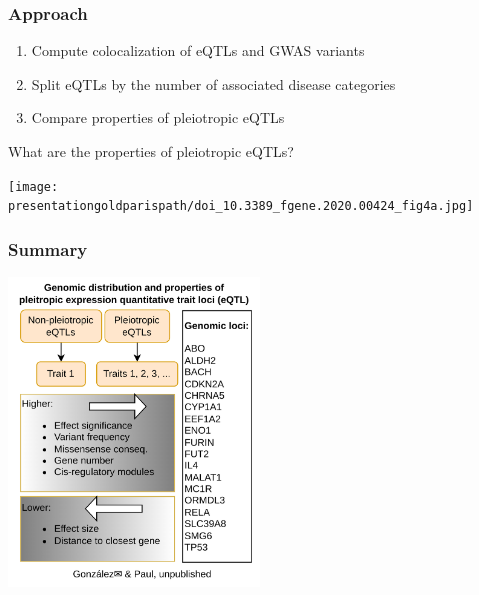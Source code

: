 \documentclass{beamer}
\newcommand*{\presentationgoldparispath}{../presentation_230120_gold2022_paris/fig/}%
\begin{document}
\begin{frame}
\frametitle{Approach}

\begin{enumerate}
\item Compute colocalization of eQTLs and GWAS variants
\item Split eQTLs by the number of associated disease categories
\item Compare properties of pleiotropic eQTLs
\end{enumerate}
%
\vfill
%
What are the properties of pleiotropic eQTLs?

\texttt{[image: \\presentationgoldparispath/doi\_10.3389\_fgene.2020.00424\_fig4a.jpg]}

\let\thefootnote\relax{}
\end{frame}

\begin{frame}
\frametitle{Summary}

\begin{center}
\includegraphics[width=0.5\textwidth]{fig/graphical_abstract.drawio.png}
\end{center}

\end{frame}
\end{document}
